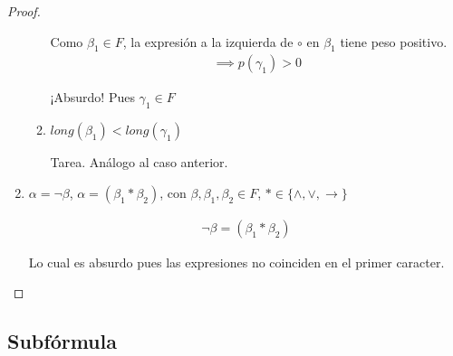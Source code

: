 \begin{proof}
\begin{enumerate}
\begin{enumerate}
                    Como $\beta_1 \in F$, la expresión a la izquierda de 
                    $\circ$ en $\beta_1$ tiene peso positivo.
                    \begin{gather*}
                        \implies p(\gamma_1) > 0
                    \end{gather*}

                    ¡Absurdo!
                    Pues $\gamma_1 \in F$

                \item $long(\beta_1) < long(\gamma_1)$

                    Tarea. Análogo al caso anterior.
            \end{enumerate}

        \item $\alpha = \neg \beta$, $\alpha = (\beta_1 * \beta_2)$, con
            $\beta, \beta_1, \beta_2 \in F$, $*\in \{ \wedge,\vee,\to \}$

            \begin{gather*}
                \neg \beta = (\beta_1 * \beta_2)
            \end{gather*}

            Lo cual es absurdo pues las expresiones no coinciden en el primer
            caracter.
    \end{enumerate}
\end{proof}


\subsection{Subfórmula}

